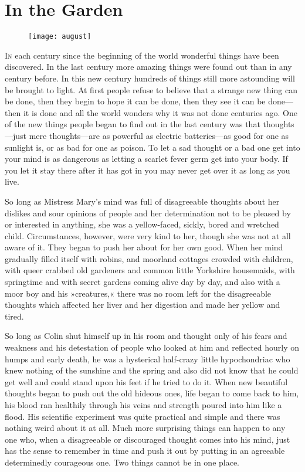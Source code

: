 \chapter{In the Garden} 
	
\begin{figure}[t!]
\centering
\texttt{[image: august]}
\end{figure}

 \lettrine[lines=6]{I}{n} each century since the beginning of the world wonderful things have been discovered. In the last century more amazing things were found out than in any century before. In this new century hundreds of things still more astounding will be brought to light. At first people refuse to believe that a strange new thing can be done, then they begin to hope it can be done, then they see it can be done—then it is done and all the world wonders why it was not done centuries ago. One of the new things people began to find out in the last century was that thoughts—just mere thoughts—are as powerful as electric batteries—as good for one as sunlight is, or as bad for one as poison. To let a sad thought or a bad one get into your mind is as dangerous as letting a scarlet fever germ get into your body. If you let it stay there after it has got in you may never get over it as long as you live.

So long as Mistress Mary's mind was full of disagreeable thoughts about her dislikes and sour opinions of people and her determination not to be pleased by or interested in anything, she was a yellow-faced, sickly, bored and wretched child. Circumstances, however, were very kind to her, though she was not at all aware of it. They began to push her about for her own good. When her mind gradually filled itself with robins, and moorland cottages crowded with children, with queer crabbed old gardeners and common little Yorkshire housemaids, with springtime and with secret gardens coming alive day by day, and also with a moor boy and his »creatures,« there was no room left for the disagreeable thoughts which affected her liver and her digestion and made her yellow and tired.

So long as Colin shut himself up in his room and thought only of his fears and weakness and his detestation of people who looked at him and reflected hourly on humps and early death, he was a hysterical half-crazy little hypochondriac who knew nothing of the sunshine and the spring and also did not know that he could get well and could stand upon his feet if he tried to do it. When new beautiful thoughts began to push out the old hideous ones, life began to come back to him, his blood ran healthily through his veins and strength poured into him like a flood. His scientific experiment was quite practical and simple and there was nothing weird about it at all. Much more surprising things can happen to any one who, when a disagreeable or discouraged thought comes into his mind, just has the sense to remember in time and push it out by putting in an agreeable determinedly courageous one. Two things cannot be in one place.

